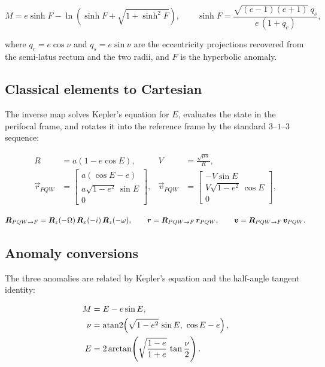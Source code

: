 \begin{equation}
  \label{eq:dyn-coe-hyper}
  M = e\sinh F - \ln\!\left(\sinh F + \sqrt{1+\sinh^{2} F}\right),
  \qquad
  \sinh F = \frac{\sqrt{(e-1)(e+1)}\ q_s}{e\,(1+q_c)},
\end{equation}

where $q_c = e\cos\nu$ and $q_s = e\sin\nu$ are the eccentricity projections
recovered from the semi-latus rectum and the two radii, and $F$ is the hyperbolic
anomaly.

\subsection{Classical elements to Cartesian}
\label{sec:dyn-coe2cart}

The inverse map solves Kepler's equation for $E$, evaluates the state in the
perifocal frame, and rotates it into the reference frame by the standard
$3$--$1$--$3$ sequence:

\begin{align}
  R &= a(1-e\cos E), &
  V &= \frac{\sqrt{\mu a}}{R}, \label{eq:dyn-cart-rv-mag}\\
  \vec{r}_{PQW} &= \begin{bmatrix} a(\cos E - e) \\ a\sqrt{1-e^2}\,\sin E \\ 0\end{bmatrix}, &
  \vec{v}_{PQW} &= \begin{bmatrix} -V\sin E \\ V\sqrt{1-e^2}\,\cos E \\ 0\end{bmatrix},
  \label{eq:dyn-cart-pqw}
\end{align}

\begin{equation}
  \label{eq:dyn-cart-rot}
  \bm{R}_{PQW\rightarrow F} = \bm{R}_z(-\Omega)\,\bm{R}_x(-i)\,\bm{R}_z(-\omega),
  \qquad
  \bm{r} = \bm{R}_{PQW\rightarrow F}\,\bm{r}_{PQW},
  \qquad
  \bm{v} = \bm{R}_{PQW\rightarrow F}\,\bm{v}_{PQW}.
\end{equation}

\subsection{Anomaly conversions}
\label{sec:dyn-anomaly}

The three anomalies are related by Kepler's equation and the half-angle tangent
identity:

\begin{align}
  M &= E - e\sin E, \label{eq:dyn-kepler}\\
  \nu &= \operatorname{atan2}\!\left(\sqrt{1-e^2}\,\sin E,\ \cos E - e\right), \label{eq:dyn-ecc2true}\\
  E &= 2\arctan\!\left(\sqrt{\frac{1-e}{1+e}}\,\tan\frac{\nu}{2}\right). \label{eq:dyn-true2ecc}
\end{align}

